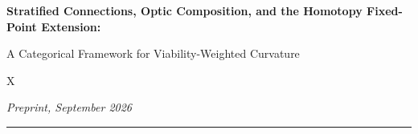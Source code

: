 \documentclass[11pt,a4paper]{article}
\theoremstyle{plain}
\theoremstyle{definition}
\theoremstyle{remark}
\begin{document}
\begin{center}
  \vspace*{0.4em}
  {\large\bfseries Stratified Connections, Optic Composition, and the
   Homotopy Fixed-Point Extension:\par
   A Categorical Framework for Viability-Weighted Curvature\par}
  \vspace{0.8em}
  {\normalsize X\par}
  \vspace{0.2em}
  {\small\itshape Preprint, September 2026\par}
  \vspace{0.6em}
  \rule{0.7\textwidth}{0.4pt}
\end{center}

\vspace{0.6em}
\end{document}
